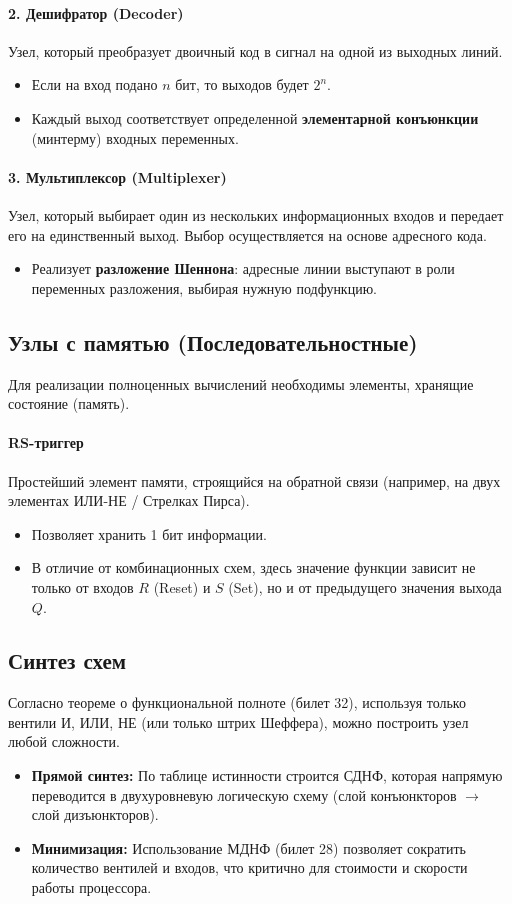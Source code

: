 \paragraph{2. Дешифратор (Decoder)}
Узел, который преобразует двоичный код в сигнал на одной из выходных линий.
\begin{itemize}
    \item Если на вход подано $n$ бит, то выходов будет $2^n$.
    \item Каждый выход соответствует определенной \textbf{элементарной конъюнкции} (минтерму) входных переменных.
\end{itemize}

\paragraph{3. Мультиплексор (Multiplexer)}
Узел, который выбирает один из нескольких информационных входов и передает его на единственный выход. Выбор осуществляется на основе адресного кода.
\begin{itemize}
    \item Реализует \textbf{разложение Шеннона}: адресные линии выступают в роли переменных разложения, выбирая нужную подфункцию.
\end{itemize}

\subsection*{Узлы с памятью (Последовательностные)}
Для реализации полноценных вычислений необходимы элементы, хранящие состояние (память).

\paragraph{RS-триггер}
Простейший элемент памяти, строящийся на обратной связи (например, на двух элементах ИЛИ-НЕ / Стрелках Пирса).
\begin{itemize}
    \item Позволяет хранить 1 бит информации.
    \item В отличие от комбинационных схем, здесь значение функции зависит не только от входов $R$ (Reset) и $S$ (Set), но и от предыдущего значения выхода $Q$.
\end{itemize}

\subsection*{Синтез схем}
Согласно теореме о функциональной полноте (билет 32), используя только вентили И, ИЛИ, НЕ (или только штрих Шеффера), можно построить узел любой сложности.
\begin{itemize}
    \item \textbf{Прямой синтез:} По таблице истинности строится СДНФ, которая напрямую переводится в двухуровневую логическую схему (слой конъюнкторов $\to$ слой дизъюнкторов).
    \item \textbf{Минимизация:} Использование МДНФ (билет 28) позволяет сократить количество вентилей и входов, что критично для стоимости и скорости работы процессора.
\end{itemize}